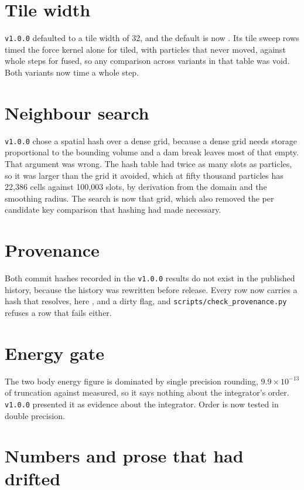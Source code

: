 \section{Tile width}

\texttt{v1.0.0} defaulted to a tile width of 32, and the default is now \BestTileWidth{}.
Its tile sweep rows timed the force kernel alone for tiled, with particles that never
moved, against whole steps for fused, so any comparison across variants in that table was
void. Both variants now time a whole step.

\section{Neighbour search}

\texttt{v1.0.0} chose a spatial hash over a dense grid, because a dense grid needs storage
proportional to the bounding volume and a dam break leaves most of that empty. That argument
was wrong. The hash table had twice as many slots as particles, so it was larger than the grid
it avoided, which at fifty thousand particles has 22,386 cells against 100,003 slots, by
derivation from the domain and the smoothing radius. The search is now that grid, which also
removed the per candidate key comparison that hashing had made necessary.

\section{Provenance}

Both commit hashes recorded in the \texttt{v1.0.0} results do not exist in the published
history, because the history was rewritten before release. Every row now carries a hash
that resolves, here \texttt{\BenchCommit}, and a dirty flag, and
\texttt{scripts/check\_provenance.py} refuses a row that fails either.

\section{Energy gate}

The two body energy figure is dominated by single precision rounding, $9.9 \times 10^{-13}$
of truncation against \EnergyDriftMeasured{} measured, so it says nothing about the
integrator's order. \texttt{v1.0.0} presented it as evidence about the integrator. Order is
now tested in double precision.

\section{Numbers and prose that had drifted}

